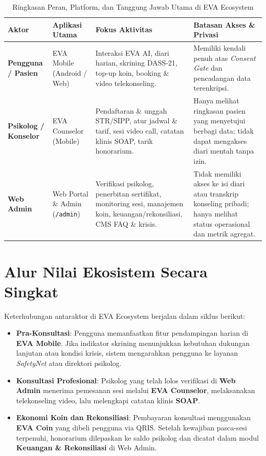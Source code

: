 \begin{table}[htbp]
  \centering
  \caption{Ringkasan Peran, Platform, dan Tanggung Jawab Utama di EVA Ecosystem}
  \label{tab:peran-ekosistem}
  \small
  \begin{tabularx}{\textwidth}{@{}p{3.0cm}p{3.0cm}XX@{}}
    \toprule
    \textbf{Aktor} & \textbf{Aplikasi Utama} & \textbf{Fokus Aktivitas} & \textbf{Batasan Akses \& Privasi} \\
    \midrule
    \textbf{Pengguna / Pasien} & EVA Mobile (Android / Web) & Interaksi EVA AI, diari harian, skrining DASS-21, top-up koin, booking \& video telekonseling. & Memiliki kendali penuh atas \textit{Consent Gate} dan pencadangan data terenkripsi. \\
    \addlinespace[4pt]
    \textbf{Psikolog / Konselor} & EVA Counselor (Mobile) & Pendaftaran \& unggah STR/SIPP, atur jadwal \& tarif, sesi video call, catatan klinis SOAP, tarik honorarium. & Hanya melihat ringkasan pasien yang menyetujui berbagi data; tidak dapat mengakses diari mentah tanpa izin. \\
    \addlinespace[4pt]
    \textbf{Web Admin} & Web Portal \& Admin (\texttt{/admin}) & Verifikasi psikolog, penerbitan sertifikat, monitoring sesi, manajemen koin, keuangan/rekonsiliasi, CMS FAQ \& krisis. & Tidak memiliki akses ke isi diari atau transkrip konseling pribadi; hanya melihat status operasional dan metrik agregat. \\
    \bottomrule
  \end{tabularx}
\end{table}

\section{Alur Nilai Ekosistem Secara Singkat}
Keterhubungan antaraktor di EVA Ecosystem berjalan dalam siklus berikut:
\begin{itemize}[leftmargin=1.4em]
  \item \textbf{Pra-Konsultasi}: Pengguna memanfaatkan fitur pendampingan harian di \textbf{EVA Mobile}. Jika indikator skrining menunjukkan kebutuhan dukungan lanjutan atau kondisi krisis, sistem mengarahkan pengguna ke layanan \textit{SafetyNet} atau direktori psikolog.
  \item \textbf{Konsultasi Profesional}: Psikolog yang telah lolos verifikasi di \textbf{Web Admin} menerima pemesanan sesi melalui \textbf{EVA Counselor}, melaksanakan telekonseling video, lalu melengkapi catatan klinis \textbf{SOAP}.
  \item \textbf{Ekonomi Koin dan Rekonsiliasi}: Pembayaran konsultasi menggunakan \textbf{EVA Coin} yang dibeli pengguna via QRIS. Setelah kewajiban pasca-sesi terpenuhi, honorarium dilepaskan ke saldo psikolog dan dicatat dalam modul \textbf{Keuangan \& Rekonsiliasi} di Web Admin.
\end{itemize}
